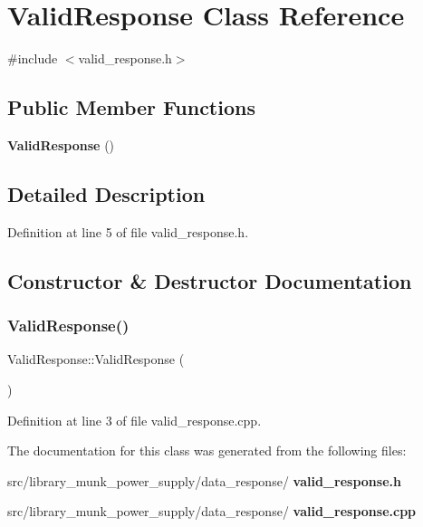 \section{Valid\+Response Class Reference}
\label{class_valid_response}


{\ttfamily \#include $<$valid\+\_\+response.\+h$>$}

\subsection*{Public Member Functions}
\begin{DoxyCompactItemize}
\item 
\textbf{ Valid\+Response} ()
\end{DoxyCompactItemize}


\subsection{Detailed Description}


Definition at line 5 of file valid\+\_\+response.\+h.



\subsection{Constructor \& Destructor Documentation}
\mbox{\label{class_valid_response_add95811cd0e150f056ee0945d7c9ccc1}} 
\subsubsection{Valid\+Response()}
{\footnotesize\ttfamily Valid\+Response\+::\+Valid\+Response (\begin{DoxyParamCaption}{ }\end{DoxyParamCaption})}



Definition at line 3 of file valid\+\_\+response.\+cpp.



The documentation for this class was generated from the following files\+:\begin{DoxyCompactItemize}
\item 
src/library\+\_\+munk\+\_\+power\+\_\+supply/data\+\_\+response/\textbf{ valid\+\_\+response.\+h}\item 
src/library\+\_\+munk\+\_\+power\+\_\+supply/data\+\_\+response/\textbf{ valid\+\_\+response.\+cpp}\end{DoxyCompactItemize}
